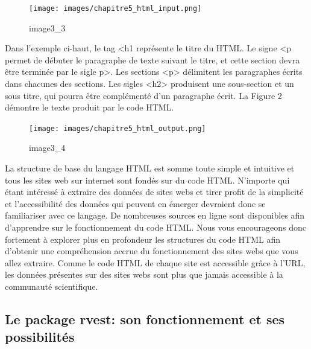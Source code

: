 \documentclass[
  letterpaper,
  DIV=11,
  numbers=noendperiod]{scrreprt}
\begin{document}
\begin{figure}

{\centering \texttt{[image: images/chapitre5\_html\_input.png]}

}

\caption{image3\_3}

\end{figure}

Dans l'exemple ci-haut, le tag \textless h1 représente le titre du HTML.
Le signe \textless p permet de débuter le paragraphe de texte suivant le
titre, et cette section devra être terminée par le sigle p\textgreater.
Les sections \textless p\textgreater{} délimitent les paragraphes écrits
dans chacunes des sections. Les sigles \textless h2\textgreater{}
produisent une sous-section et un sous titre, qui pourra être
complémenté d'un paragraphe écrit. La Figure 2 démontre le texte produit
par le code HTML.

\begin{figure}

{\centering \texttt{[image: images/chapitre5\_html\_output.png]}

}

\caption{image3\_4}

\end{figure}

La structure de base du langage HTML est somme toute simple et intuitive
et tous les sites web sur internet sont fondés sur du code HTML.
N'importe qui étant intéressé à extraire des données de sites webs et
tirer profit de la simplicité et l'accessibilité des données qui peuvent
en émerger devraient donc se familiariser avec ce langage. De nombreuses
sources en ligne sont disponibles afin d'apprendre sur le fonctionnement
du code HTML. Nous vous encourageons donc fortement à explorer plus en
profondeur les structures du code HTML afin d'obtenir une compréhension
accrue du fonctionnement des sites webs que vous allez extraire. Comme
le code HTML de chaque site est accessible grâce à l'URL, les données
présentes sur des sites webs sont plus que jamais accessible à la
communauté scientifique.

\hypertarget{le-package-rvest-son-fonctionnement-et-ses-possibilituxe9s}{%
\subsection{\texorpdfstring{\textbf{Le package rvest: son fonctionnement
et ses
possibilités}}{Le package rvest: son fonctionnement et ses possibilités}}\label{le-package-rvest-son-fonctionnement-et-ses-possibilituxe9s}}
\end{document}
